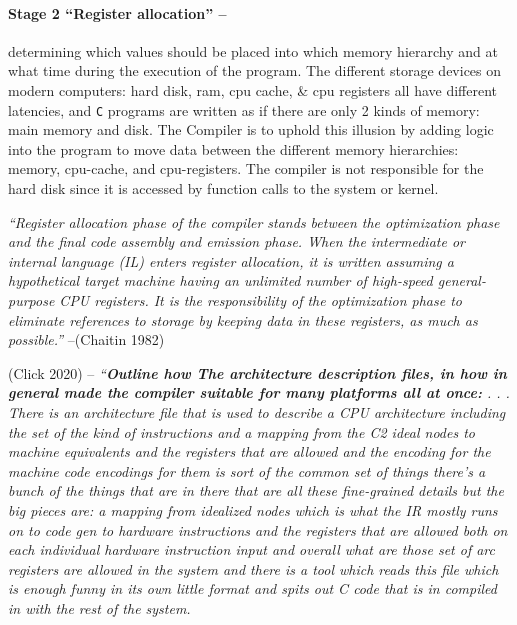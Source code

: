 \hypertarget{stage-2-register-allocation}{%
\paragraph{Stage 2 ``Register allocation''
--}\label{stage-2-register-allocation}}

determining which values should be placed into which memory hierarchy
and at what time during the execution of the program. The different
storage devices on modern computers: hard disk, ram, cpu cache, \& cpu
registers all have different latencies, and \texttt{C} programs are
written as if there are only 2 kinds of memory: main memory and disk.
The Compiler is to uphold this illusion by adding logic into the program
to move data between the different memory hierarchies: memory,
cpu-cache, and cpu-registers. The compiler is not responsible for the
hard disk since it is accessed by function calls to the system or
kernel.

\emph{``Register allocation phase of the compiler stands between the
optimization phase and the final code assembly and emission phase. When
the intermediate or internal language (IL) enters register allocation,
it is written assuming a hypothetical target machine having an unlimited
number of high-speed general-purpose CPU registers. It is the
responsibility of the optimization phase to eliminate references to
storage by keeping data in these registers, as much as possible.''}
--(Chaitin 1982)

(Click 2020) -- \emph{``\textbf{Outline how The architecture description
files, in how in general made the compiler suitable for many platforms
all at once:} . . . There is an architecture file that is used to
describe a CPU architecture including the set of the kind of
instructions and a mapping from the C2 ideal nodes to machine
equivalents and the registers that are allowed and the encoding for the
machine code encodings for them is sort of the common set of things
there's a bunch of the things that are in there that are all these
fine-grained details but the big pieces are: a mapping from idealized
nodes which is what the IR mostly runs on to code gen to hardware
instructions and the registers that are allowed both on each individual
hardware instruction input and overall what are those set of arc
registers are allowed in the system and there is a tool which reads this
file which is enough funny in its own little format and spits out C code
that is in compiled in with the rest of the system.}

